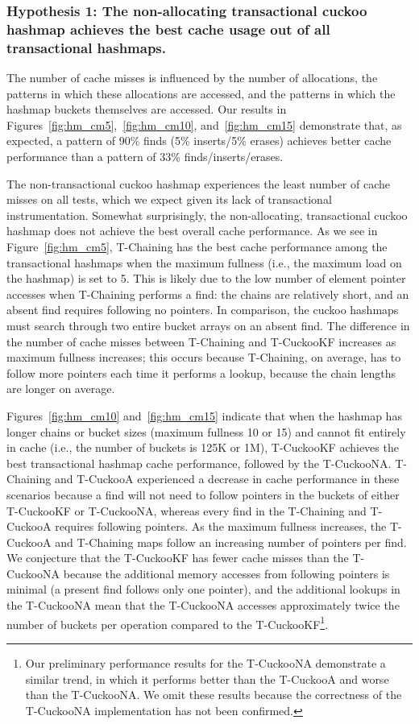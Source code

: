 \subsubsection{Hypothesis 1: The non-allocating transactional cuckoo hashmap achieves the best cache usage out of all transactional hashmaps.}
\label{section:hmcm}

The number of cache misses is influenced by the number of allocations, the patterns in which these allocations are accessed, and the patterns in which the hashmap buckets themselves are accessed. Our results in Figures~\ref{fig:hm_cm5},~\ref{fig:hm_cm10}, and~\ref{fig:hm_cm15} demonstrate that, as expected, a pattern of 90\% finds (5\% inserts/5\% erases) achieves better cache performance than a pattern of 33\% finds/inserts/erases.

The non-transactional cuckoo hashmap experiences the least number of cache misses on all tests, which we expect given its lack of transactional instrumentation. Somewhat surprisingly, the non-allocating, transactional cuckoo hashmap does not achieve the best overall cache performance. 
As we see in Figure~\ref{fig:hm_cm5}, T-Chaining has the best cache performance among the transactional hashmaps when the maximum fullness (i.e., the maximum load on the hashmap) is set to 5. This is likely due to the low number of element pointer accesses when T-Chaining performs a find: the chains are relatively short, and an absent find requires following no pointers. In comparison, the cuckoo hashmaps must search through two entire bucket arrays on an absent find. The difference in the number of cache misses between T-Chaining and T-CuckooKF increases as maximum fullness increases; this occurs because T-Chaining, on average, has to follow more pointers each time it performs a lookup, because the chain lengths are longer on average.

Figures~\ref{fig:hm_cm10} and~\ref{fig:hm_cm15} indicate that when the hashmap has longer chains or bucket sizes (maximum fullness 10 or 15) and cannot fit entirely in cache (i.e., the number of buckets is 125K or 1M), T-CuckooKF achieves the best transactional hashmap cache performance, followed by the T-CuckooNA. 
T-Chaining and T-CuckooA experienced a decrease in cache performance in these scenarios because a find will not need to follow pointers in the buckets of either T-CuckooKF or T-CuckooNA, whereas every find in the T-Chaining and T-CuckooA requires following pointers. As the maximum fullness increases, the T-CuckooA and T-Chaining maps follow an increasing number of pointers per find.
We conjecture that the T-CuckooKF has fewer cache misses than the T-CuckooNA because the additional memory accesses from following pointers is minimal (a present find follows only one pointer), and the additional lookups in the T-CuckooNA mean that the T-CuckooNA accesses approximately twice the number of buckets per operation compared to the T-CuckooKF\footnote{Our preliminary performance results for the T-CuckooNA demonstrate a similar trend, in which it performs better than the T-CuckooA and worse than the T-CuckooNA. We omit these results because the correctness of the T-CuckooNA implementation has not been confirmed.}.

